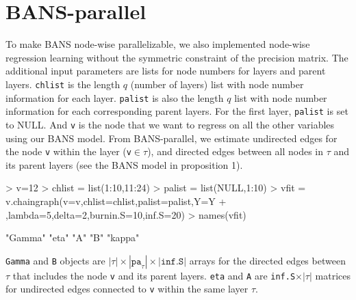 \documentclass{article}
\begin{document}
\section{BANS-parallel}
To make BANS node-wise parallelizable, we also implemented node-wise regression learning without the symmetric constraint of the precision matrix. The additional input parameters are lists for node numbers for layers and parent layers. \texttt{chlist} is the length $q$ (number of layers) list with node number information for each layer. \texttt{palist} is also the length $q$ list with node number information for each corresponding parent layers. For the first layer, \texttt{palist} is set to NULL. And \texttt{v} is the node that we want to regress on all the other variables using our BANS model. From BANS-parallel, we estimate undirected edges for the node \texttt{v} within the layer (\texttt{v}$\in\tau$), and directed edges between all nodes in $\tau$ and its parent layers (see the BANS model in proposition 1).
\begin{Schunk}
\begin{Sinput}
> v=12
> chlist = list(1:10,11:24)
> palist = list(NULL,1:10)
> vfit = v.chaingraph(v=v,chlist=chlist,palist=palist,Y=Y
+                     ,lambda=5,delta=2,burnin.S=10,inf.S=20)
> names(vfit)
\end{Sinput}
\begin{Soutput}
[1] "Gamma" "eta"   "A"     "B"     "kappa"
\end{Soutput}
\end{Schunk}
\texttt{Gamma} and \texttt{B} objects are $|\tau| \times |\texttt{pa}_\tau|\times \texttt{|inf.S|}$ arrays for the directed edges between $\tau$ that includes the node \texttt{v} and its parent layers. \texttt{eta} and \texttt{A} are \texttt{inf.S}$\times |\tau|$ matrices for undirected edges connected to \texttt{v} within the same layer $\tau$.
\end{document}
